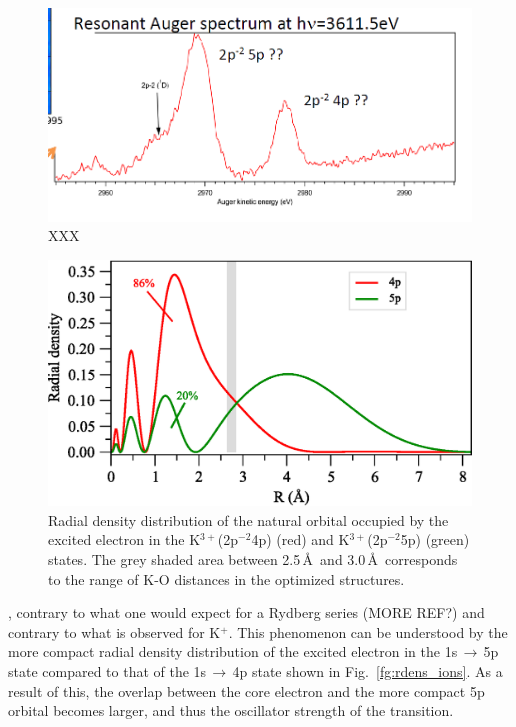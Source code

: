 \documentclass[journal=jacsat,manuscript=suppinfo]{achemso}
\newcommand{\ki}{K$^{+}$}
\begin{document}
\begin{figure}
\centering
\includegraphics[scale=1.0]{figures/sfg_intensity_ratio.png}
\caption{XXX}
\label{fg:intensity_ratio}
\end{figure}




\begin{figure}[h!]
\centering
\includegraphics[scale=1.0]{figures/k_2p4_4p5p_rad_dens.eps}
\caption{Radial density distribution of the natural orbital occupied by the excited electron in the K$^{3+}$(2p$^{-2}$4p) (red) and K$^{3+}$(2p$^{-2}$5p) (green) states. The grey shaded area between 2.5\,\AA~and 3.0\,\AA~corresponds to the range of K-O distances {\color{red}in the optimized structures}.}
\label{fg:k_2p4nl_raddens}
\end{figure}


, contrary to what one would expect for a Rydberg series \citep{hussain07:022710}(MORE REF?) and contrary to what is observed for \ki. This phenomenon can be understood by the more compact radial density distribution of the excited electron in the 1s$\,\rightarrow\,$5p state compared to that of the 1s$\,\rightarrow\,$4p state shown in Fig.\ \ref{fg:rdens_ions}. As a result of this, the overlap between the core electron and the more compact 5p orbital becomes larger, and thus the oscillator strength of the transition.
\end{document}
